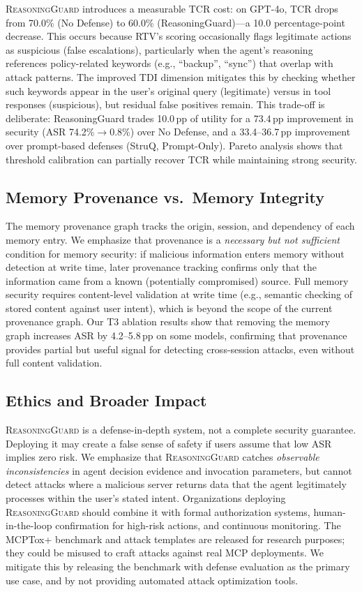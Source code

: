 \textsc{ReasoningGuard} introduces a measurable TCR cost: on GPT-4o, TCR drops from 70.0\% (No Defense) to 60.0\% (ReasoningGuard)---a 10.0 percentage-point decrease. This occurs because RTV's scoring occasionally flags legitimate actions as suspicious (false escalations), particularly when the agent's reasoning references policy-related keywords (e.g., ``backup'', ``sync'') that overlap with attack patterns. The improved TDI dimension mitigates this by checking whether such keywords appear in the user's original query (legitimate) versus in tool responses (suspicious), but residual false positives remain. This trade-off is deliberate: ReasoningGuard trades 10.0\,pp of utility for a 73.4\,pp improvement in security (ASR 74.2\%$\to$0.8\%) over No Defense, and a 33.4--36.7\,pp improvement over prompt-based defenses (StruQ, Prompt-Only). Pareto analysis shows that threshold calibration can partially recover TCR while maintaining strong security.

\subsection{Memory Provenance vs.\ Memory Integrity}

The memory provenance graph tracks the origin, session, and dependency of each memory entry. We emphasize that provenance is a \emph{necessary but not sufficient} condition for memory security: if malicious information enters memory without detection at write time, later provenance tracking confirms only that the information came from a known (potentially compromised) source. Full memory security requires content-level validation at write time (e.g., semantic checking of stored content against user intent), which is beyond the scope of the current provenance graph. Our T3 ablation results show that removing the memory graph increases ASR by 4.2--5.8\,pp on some models, confirming that provenance provides partial but useful signal for detecting cross-session attacks, even without full content validation.

\subsection{Ethics and Broader Impact}

\textsc{ReasoningGuard} is a defense-in-depth system, not a complete security guarantee. Deploying it may create a false sense of safety if users assume that low ASR implies zero risk. We emphasize that \textsc{ReasoningGuard} catches \emph{observable inconsistencies} in agent decision evidence and invocation parameters, but cannot detect attacks where a malicious server returns data that the agent legitimately processes within the user's stated intent. Organizations deploying \textsc{ReasoningGuard} should combine it with formal authorization systems, human-in-the-loop confirmation for high-risk actions, and continuous monitoring. The MCPTox+ benchmark and attack templates are released for research purposes; they could be misused to craft attacks against real MCP deployments. We mitigate this by releasing the benchmark with defense evaluation as the primary use case, and by not providing automated attack optimization tools.

